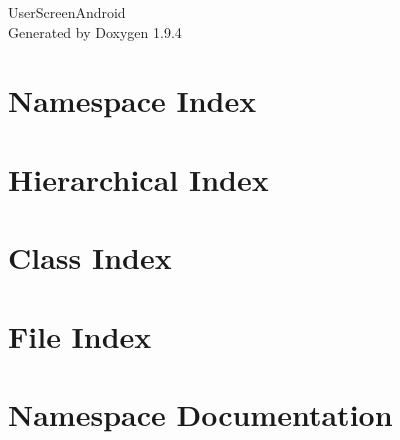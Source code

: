 \documentclass[twoside]{book}
\newcommand{\+}{\discretionary{\mbox{\scriptsize$\hookleftarrow$}}{}{}}
\newcommand{\clearemptydoublepage}{%
    \newpage{\pagestyle{empty}\cleardoublepage}%
  }
\begin{document}
  \raggedbottom
    \hypersetup{pageanchor=false,
                bookmarksnumbered=true,
                pdfencoding=unicode
               }
  \begin{titlepage}
  \vspace*{7cm}
  \begin{center}%
  {\Large User\+Screen\+Android}\\
  \vspace*{1cm}
  {\large Generated by Doxygen 1.9.4}\\
  \end{center}
  \end{titlepage}
  \clearemptydoublepage
  \tableofcontents
  \clearemptydoublepage
  \hypersetup{pageanchor=true}
\chapter{Namespace Index}

\chapter{Hierarchical Index}

\chapter{Class Index}

\chapter{File Index}

\chapter{Namespace Documentation}





\end{document}

